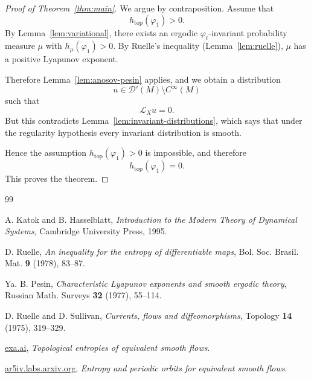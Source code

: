 \documentclass{article}
\theoremstyle{definition}
\newcommand{\cD}{\mathcal{D}}
\newcommand{\cL}{\mathcal{L}}
\begin{document}
\begin{proof}[Proof of Theorem~\ref{thm:main}]
We argue by contraposition. Assume that
\[
h_{\mathrm{top}}(\varphi_1)>0.
\]
By Lemma~\ref{lem:variational}, there exists an ergodic
$\varphi_t$-invariant probability measure $\mu$ with
$h_\mu(\varphi_1)>0$. By Ruelle's inequality
(Lemma~\ref{lem:ruelle}), $\mu$ has a positive Lyapunov exponent.

Therefore Lemma~\ref{lem:anosov-pesin} applies, and we obtain a
distribution
\[
u\in \cD'(M)\setminus C^\infty(M)
\]
such that
\[
\cL_X u=0.
\]
But this contradicts Lemma~\ref{lem:invariant-distributions}, which says
that under the regularity hypothesis every invariant distribution is smooth.

Hence the assumption $h_{\mathrm{top}}(\varphi_1)>0$ is impossible, and
therefore
\[
h_{\mathrm{top}}(\varphi_1)=0.
\]
This proves the theorem.
\end{proof}

\begin{thebibliography}{99}

A. Katok and B. Hasselblatt,
\emph{Introduction to the Modern Theory of Dynamical Systems},
Cambridge University Press, 1995.

D. Ruelle,
\emph{An inequality for the entropy of differentiable maps},
Bol. Soc. Brasil. Mat. \textbf{9} (1978), 83--87.

Ya. B. Pesin,
\emph{Characteristic Lyapunov exponents and smooth ergodic theory},
Russian Math. Surveys \textbf{32} (1977), 55--114.

D. Ruelle and D. Sullivan,
\emph{Currents, flows and diffeomorphisms},
Topology \textbf{14} (1975), 319--329.

\href{https://exa.ai/library/publication/lbqpyt46khy}{exa.ai},
\emph{Topological entropies of equivalent smooth flows}.

\href{https://ar5iv.labs.arxiv.org/html/1111.0111}{ar5iv.labs.arxiv.org},
\emph{Entropy and periodic orbits for equivalent smooth flows}.

\end{thebibliography}
\end{document}
